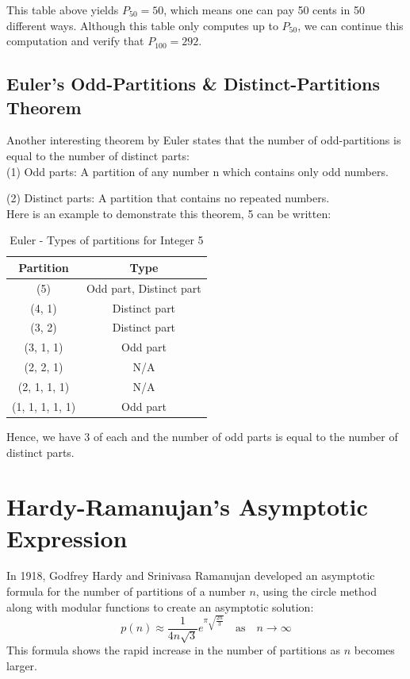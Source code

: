 \documentclass{article}
\begin{document}
\noindent  This table above yields $P_{50} = 50$, which means one can pay 50 cents in 50 different ways. Although this table only computes up to $P_{50}$, we can continue this computation and verify that $P_{100} = 292$.


\newpage
\subsection{Euler's Odd-Partitions \& Distinct-Partitions Theorem}
Another interesting theorem by Euler states that the number of odd-partitions is equal to the number of distinct parts:\\

\noindent (1) Odd parts: A partition of any number n which contains only odd numbers.

\noindent (2) Distinct parts: A partition that contains no repeated numbers. \\

\noindent Here is an example to demonstrate this theorem, 5 can be written:
\begin{table}[h]
    \centering 
    \begin{tabular}{|c|c|}
    \hline
    Partition & Type \\
    \hline
    (5) & Odd part, Distinct part \\
    (4, 1) & Distinct part \\
    (3, 2) & Distinct part \\
    (3, 1, 1) & Odd part \\
    (2, 2, 1) & N/A \\
    (2, 1, 1, 1) & N/A \\
    (1, 1, 1, 1, 1) & Odd part \\
    \hline
    \end{tabular}
    \caption{Euler - Types of partitions for Integer 5}
\end{table}
    
\noindent Hence, we have 3 of each and the number of odd parts is equal to the number of distinct parts.

\section{Hardy-Ramanujan’s Asymptotic Expression}
In 1918, Godfrey Hardy and Srinivasa Ramanujan developed an asymptotic formula for the number of partitions of a number \( n\), using the circle method along with modular functions to create an asymptotic solution:
\[
p(n) \approx \frac{1}{4n\sqrt{3}} e^{\pi \sqrt{\frac{2n}{3}}} \quad \text{as} \quad n \to \infty
\]
This formula shows the rapid increase in the number of partitions as \( n \) becomes larger.\\
\end{document}
